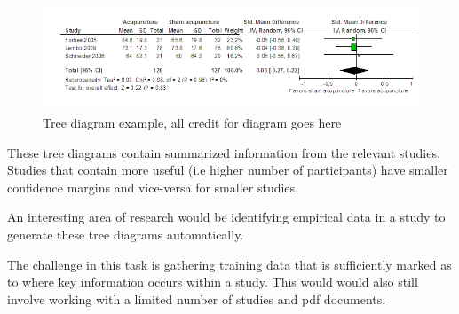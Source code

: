 \begin{figure}[H]
\center
\includegraphics[width=16cm]{figures/tree.png}
\caption{Tree diagram example, all credit for diagram goes here \cite{Manheimer2012}}
\end{figure}

These tree diagrams contain summarized information from the relevant studies. Studies that contain more useful (i.e higher number of participants) have smaller confidence margins and vice-versa for smaller studies.

An interesting area of research would be identifying empirical data in a study to generate these tree diagrams automatically.

The challenge in this task is gathering training data that is sufficiently marked as to where key information occurs within a study. This would would also still involve working with a limited number of studies and pdf documents.


